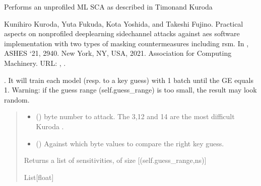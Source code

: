 \documentclass[letterpaper,10pt,english]{sphinxmanual}
\begin{document}
\begin{fulllineitems}
\begin{fulllineitems}
\sphinxAtStartPar
Performs an unprofiled ML SCA as described in Timon\sphinxfootnotemark[1] and
Kuroda %
\begin{footnote}[2]\sphinxAtStartFootnote
Kunihiro Kuroda, Yuta Fukuda, Kota Yoshida, and Takeshi Fujino. Practical aspects on non\sphinxhyphen{}profiled deep\sphinxhyphen{}learning side\sphinxhyphen{}channel attacks against aes software implementation with two types of masking countermeasures including rsm. In , ASHES ‘21, 29\textendash{}40. New York, NY, USA, 2021. Association for Computing Machinery. URL: , .
%
\end{footnote}. It will train each model (resp. to a key guess)
with 1 batch until the GE equals 1. Warning: if the guess range (self.guess\_range) is too
small, the result may look random.
\begin{quote}\begin{description}
\begin{itemize}
\item {} 
\sphinxAtStartPar
{} () \textendash{} byte number to attack. The 3,12 and 14 are the most difficult  Kuroda \sphinxfootnotemark[2].

\item {} 
\sphinxAtStartPar
{} (\sphinxstyleliteralemphasis{\sphinxupquote{, }}\sphinxstyleliteralemphasis{\sphinxupquote{(}}\sphinxstyleliteralemphasis{\sphinxupquote{)}}) \textendash{} Against which byte values to compare the right key guess.

\end{itemize}

\sphinxAtStartPar
Returns a list of sensitivities, of size {[}(self.guess\_range,ns){]}

\sphinxAtStartPar
List{[}float{]}

\end{description}\end{quote}


\end{fulllineitems}
\end{fulllineitems}
\end{document}
